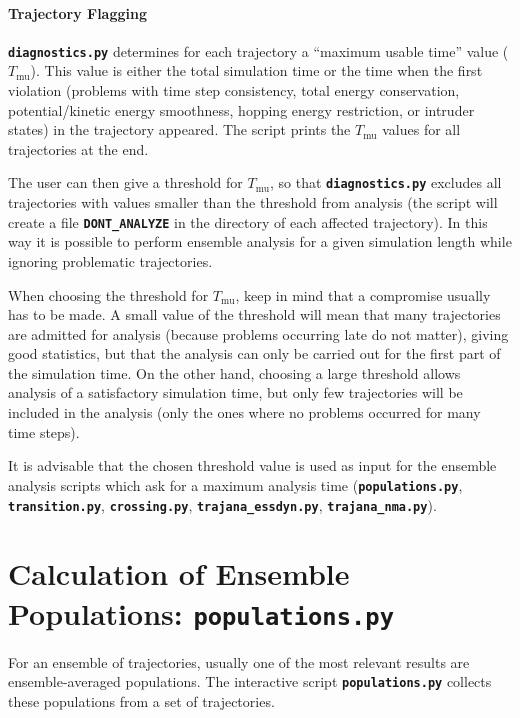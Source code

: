 \documentclass[a4paper,10pt,DIV=15,openany,twoside=false]{scrbook}
\newcommand{\ttt}[1]{\textbf{\texttt{#1}}}
\begin{document}
\paragraph{Trajectory Flagging}

\ttt{diagnostics.py} determines for each trajectory a ``maximum usable time'' value ($T_\text{mu}$).
This value is either the total simulation time or the time when the first violation (problems with time step consistency, total energy conservation, potential/kinetic energy smoothness, hopping energy restriction, or intruder states) in the trajectory appeared.
The script prints the $T_\text{mu}$ values for all trajectories at the end.

The user can then give a threshold for $T_\text{mu}$, so that \ttt{diagnostics.py} excludes all trajectories with values smaller than the threshold from analysis (the script will create a file \ttt{DONT\_ANALYZE} in the directory of each affected trajectory).
In this way it is possible to perform ensemble analysis for a given simulation length while ignoring problematic trajectories.

When choosing the threshold for $T_\text{mu}$, keep in mind that a compromise usually has to be made.
A small value of the threshold will mean that many trajectories are admitted for analysis (because problems occurring late do not matter), giving good statistics, but that the analysis can only be carried out for the first part of the simulation time.
On the other hand, choosing a large threshold allows analysis of a satisfactory simulation time, but only few trajectories will be included in the analysis (only the ones where no problems occurred for many time steps).

It is advisable that the chosen threshold value is used as input for the ensemble analysis scripts which ask for a maximum analysis time (\ttt{populations.py}, \ttt{transition.py}, \ttt{crossing.py}, \ttt{trajana\_essdyn.py}, \ttt{trajana\_nma.py}).







\section{Calculation of Ensemble Populations: \ttt{populations.py}}\label{sec:populations.py}

For an ensemble of trajectories, usually one of the most relevant results are ensemble-averaged populations. The interactive script \ttt{populations.py} collects these populations from a set of trajectories. 
\end{document}
